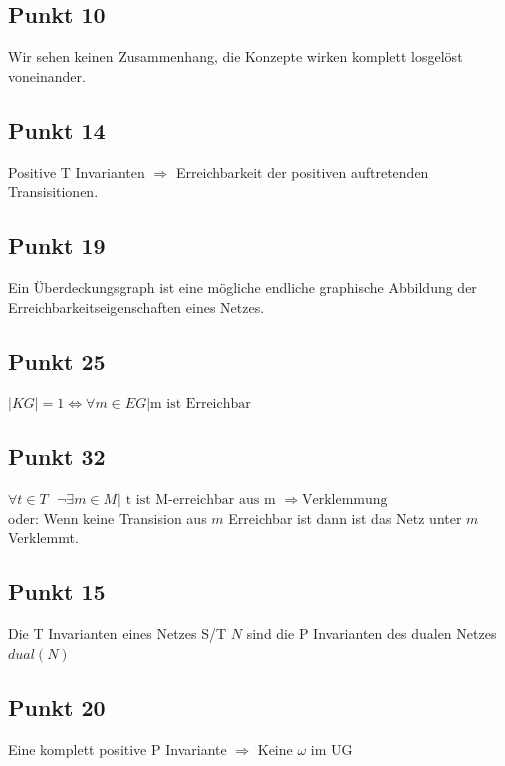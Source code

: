 \documentclass[10pt]{scrartcl}
\begin{document}
				\subsection{Punkt 10}
				Wir sehen keinen Zusammenhang, die Konzepte wirken komplett losgelöst voneinander.
				
				\subsection{Punkt 14}	
				Positive T Invarianten $\Longrightarrow$ Erreichbarkeit der positiven auftretenden Transisitionen. 
				
				\subsection{Punkt 19}
				Ein Überdeckungsgraph ist eine mögliche endliche graphische Abbildung der Erreichbarkeitseigenschaften eines Netzes.
				
				\subsection{Punkt 25}
				$|KG| = 1 \Longleftrightarrow \forall m \in EG | \text{m ist Erreichbar}$ 
			
				\subsection{Punkt 32}
				$\forall t  \in T \textbf{ } \neg \exists m \in M | \text{ t ist M-erreichbar aus m } \Longrightarrow \text{Verklemmung} $\\ oder: Wenn keine Transision aus $m$ Erreichbar ist dann ist das Netz unter $m$ Verklemmt.
				
				\subsection{Punkt 15}
				Die T Invarianten eines Netzes S/T $N$ sind die P Invarianten des dualen Netzes $dual(N)$
				
				\subsection{Punkt 20}
				Eine komplett positive P Invariante $\Longrightarrow$ Keine $\omega$ im UG
				
\end{document}
